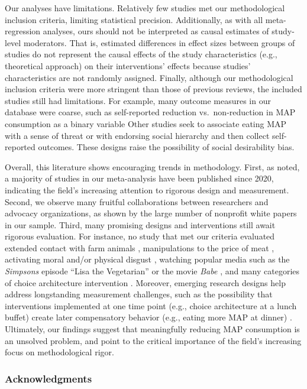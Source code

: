 \documentclass[preprint, 3p,
authoryear]{elsarticle} %
\begin{document}
Our analyses have limitations. Relatively few studies met our
methodological inclusion criteria, limiting statistical precision.
Additionally, as with all meta-regression analyses, ours should not be
interpreted as causal estimates of study-level moderators. That is,
estimated differences in effect sizes between groups of studies do not
represent the causal effects of the study characteristics (e.g.,
theoretical approach) on their interventions' effects because studies'
characteristics are not randomly assigned. Finally, although our
methodological inclusion criteria were more stringent than those of
previous reviews, the included studies still had limitations. For
example, many outcome measures in our database were coarse, such as
self-reported reduction vs.~non-reduction in MAP consumption as a binary
variable \citep{aberman2018} Other studies seek to associate eating MAP
with a sense of threat \citep{fehrenbach2015} or with endorsing social
hierarchy \citep{allen2002} and then collect self-reported outcomes.
These designs raise the possibility of social desirability bias.

Overall, this literature shows encouraging trends in methodology. First,
as noted, a majority of studies in our meta-analysis have been published
since 2020, indicating the field's increasing attention to rigorous
design and measurement. Second, we observe many fruitful collaborations
between researchers and advocacy organizations, as shown by the large
number of nonprofit white papers in our sample. Third, many promising
designs and interventions still await rigorous evaluation. For instance,
no study that met our criteria evaluated extended contact with farm
animals \citep{cerrato2022}, manipulations to the price of meat
\citep{wilde2016}, activating moral and/or physical disgust
\citep{palomo2018}, watching popular media such as the \emph{Simpsons}
episode ``Lisa the Vegetarian'' \citep{byrd2010} or the movie
\emph{Babe} \citep{novatna2019}, and many categories of choice
architecture intervention \citep{olafsson2024}. Moreover, emerging
research designs help address longstanding measurement challenges, such
as the possibility that interventions implemented at one time point
(e.g., choice architecture at a lunch buffet) create later compensatory
behavior (e.g., eating more MAP at dinner) \citep{vocski2024}.
Ultimately, our findings suggest that meaningfully reducing MAP
consumption is an unsolved problem, and point to the critical importance
of the field's increasing focus on methodological rigor.

\subsubsection{Acknowledgments}
\end{document}
